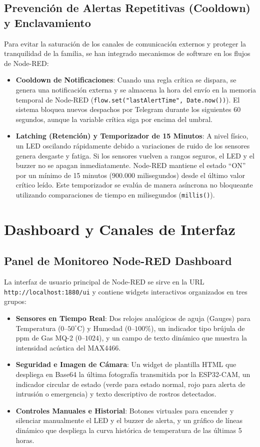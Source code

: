 \documentclass[12pt,letterpaper]{article}
\begin{document}
\subsection{Prevención de Alertas Repetitivas (Cooldown) y Enclavamiento}
Para evitar la saturación de los canales de comunicación externos y proteger la tranquilidad de la familia, se han integrado mecanismos de software en los flujos de Node-RED:
\begin{itemize}
    \item \textbf{Cooldown de Notificaciones}: Cuando una regla crítica se dispara, se genera una notificación externa y se almacena la hora del envío en la memoria temporal de Node-RED (\texttt{flow.set("lastAlertTime", Date.now())}). El sistema bloquea nuevos despachos por Telegram durante los siguientes 60 segundos, aunque la variable crítica siga por encima del umbral.
    \item \textbf{Latching (Retención) y Temporizador de 15 Minutos}: A nivel físico, un LED oscilando rápidamente debido a variaciones de ruido de los sensores genera desgaste y fatiga. Si los sensores vuelven a rangos seguros, el LED y el buzzer no se apagan inmediatamente. Node-RED mantiene el estado ``ON'' por un mínimo de 15 minutos ($900.000$ milisegundos) desde el último valor crítico leído. Este temporizador se evalúa de manera asíncrona no bloqueante utilizando comparaciones de tiempo en milisegundos (\texttt{millis()}).
\end{itemize}

\section{Dashboard y Canales de Interfaz}

\subsection{Panel de Monitoreo Node-RED Dashboard}
La interfaz de usuario principal de Node-RED se sirve en la URL \texttt{http://localhost:1880/ui} y contiene widgets interactivos organizados en tres grupos:
\begin{itemize}
    \item \textbf{Sensores en Tiempo Real}: Dos relojes analógicos de aguja (Gauges) para Temperatura ($0\text{--}50^{\circ}\text{C}$) y Humedad ($0\text{--}100\%$), un indicador tipo brújula de ppm de Gas MQ-2 ($0\text{--}1024$), y un campo de texto dinámico que muestra la intensidad acústica del MAX4466.
    \item \textbf{Seguridad e Imagen de Cámara}: Un widget de plantilla HTML que despliega en Base64 la última fotografía transmitida por la ESP32-CAM, un indicador circular de estado (verde para estado normal, rojo para alerta de intrusión o emergencia) y texto descriptivo de rostros detectados.
    \item \textbf{Controles Manuales e Historial}: Botones virtuales para encender y silenciar manualmente el LED y el buzzer de alerta, y un gráfico de líneas dinámico que despliega la curva histórica de temperatura de las últimas 5 horas.
\end{itemize}
\end{document}
